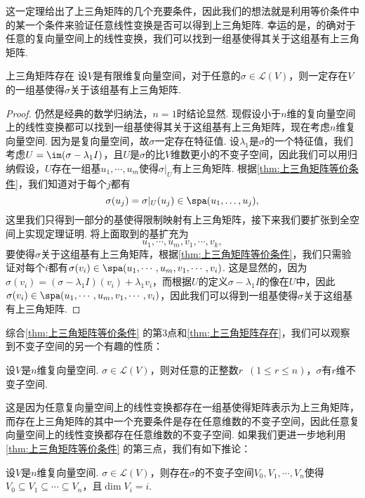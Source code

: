 这一定理给出了上三角矩阵的几个充要条件，因此我们的想法就是利用等价条件中的某一个条件来验证任意线性变换是否可以得到上三角矩阵. 幸运的是，的确对于任意的复向量空间上的线性变换，我们可以找到一组基使得其关于这组基有上三角矩阵.
\begin{theorem}{}{上三角矩阵存在}
    设$V$是有限维复向量空间，对于任意的$\sigma\in \mathcal{L}(V)$，则一定存在$V$的一组基使得$\sigma$关于该组基有上三角矩阵.
\end{theorem}
\begin{proof}
    仍然是经典的数学归纳法，$n=1$时结论显然. 现假设小于$n$维的复向量空间上的线性变换都可以找到一组基使得其关于这组基有上三角矩阵，现在考虑$n$维复向量空间. 因为是复向量空间，故$\sigma$一定存在特征值. 设$\lambda_1$是$\sigma$的一个特征值，我们考虑$U=\im(\sigma-\lambda_1 I)$，且$U$是$\sigma$的比$V$维数更小的不变子空间，因此我们可以用归纳假设，$U$存在一组基$u_1,\cdots,u_m$使得$\sigma\vert_U$有上三角矩阵. 根据\autoref{thm:上三角矩阵等价条件}，我们知道对于每个$j$都有
    \[\sigma(u_j)=\sigma\vert_U(u_j)\in\spa(u_1,\ldots,u_j),\]
    这里我们只得到一部分的基使得限制映射有上三角矩阵，接下来我们要扩张到全空间上实现定理证明. 将上面取到的基扩充为
    \[u_1,\cdots,u_m,v_1,\cdots,v_k,\]
    要使得$\sigma$关于这组基有上三角矩阵，根据\autoref{thm:上三角矩阵等价条件}，我们只需验证对每个$i$都有$\sigma(v_i)\in\spa(u_1,\cdots,u_m,v_1,\cdots,v_i)$. 这是显然的，因为$\sigma(v_i)=(\sigma-\lambda_1 I)(v_i)+\lambda_1 v_i$，而根据$U$的定义$\sigma-\lambda_1 I$的像在$U$中，因此$\sigma(v_i)\in\spa(u_1,\cdots,u_m,v_1,\cdots,v_i)$，因此我们可以得到一组基使得$\sigma$关于这组基有上三角矩阵.
\end{proof}

综合\autoref{thm:上三角矩阵等价条件} 的第3点和\autoref{thm:上三角矩阵存在}，我们可以观察到不变子空间的另一个有趣的性质：
\begin{corollary}{}{}
    设$V$是$n$维复向量空间. $\sigma\in \mathcal{L}(V)$，则对任意的正整数$r\enspace(1\leqslant r\leqslant n)$，$\sigma$有$r$维不变子空间.
\end{corollary}
这是因为任意复向量空间上的线性变换都存在一组基使得矩阵表示为上三角矩阵，而存在上三角矩阵的其中一个充要条件是存在任意维数的不变子空间，因此任意复向量空间上的线性变换都存在任意维数的不变子空间. 如果我们更进一步地利用\autoref{thm:上三角矩阵等价条件} 的第三点，我们有如下推论：
\begin{corollary}{}{}
    设$V$是$n$维复向量空间. $\sigma\in \mathcal{L}(V)$，则存在$\sigma$的不变子空间$V_0,V_1,\cdots,V_n$使得$V_0\subseteq V_1\subseteq\cdots\subseteq V_n$，且$\dim V_i=i$.
\end{corollary}

